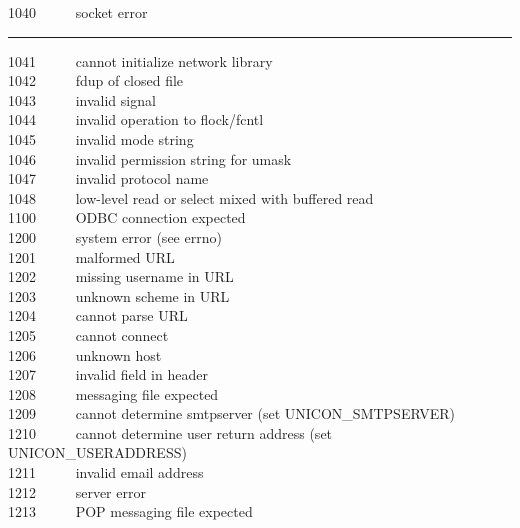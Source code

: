 1040 \ \ \ \ \ socket error\\

\bigskip\hrule\vspace{0.1cm}

1041 \ \ \ \ \ cannot initialize network library\\
1042 \ \ \ \ \ fdup of closed file\\
1043 \ \ \ \ \ invalid signal\\
1044 \ \ \ \ \ invalid operation to flock/fcntl\\
1045 \ \ \ \ \ invalid mode string\\
1046 \ \ \ \ \ invalid permission string for umask\\
1047 \ \ \ \ \ invalid protocol name\\
1048 \ \ \ \ \ low-level read or select mixed with buffered read\\
1100 \ \ \ \ \ ODBC connection expected\\
1200 \ \ \ \ \ system error (see errno)\\
1201 \ \ \ \ \ malformed URL\\
1202 \ \ \ \ \ missing username in URL\\
1203 \ \ \ \ \ unknown scheme in URL\\
1204 \ \ \ \ \ cannot parse URL\\
1205 \ \ \ \ \ cannot connect\\
1206 \ \ \ \ \ unknown host\\
1207 \ \ \ \ \ invalid field in header\\
1208 \ \ \ \ \ messaging file expected\\
1209 \ \ \ \ \ cannot determine smtpserver
(set UNICON\_SMTPSERVER)\\
1210 \ \ \ \ \ cannot determine user return address
(set UNICON\_USERADDRESS)\\
1211 \ \ \ \ \ invalid email address\\
1212 \ \ \ \ \ server error\\
1213 \ \ \ \ \ POP messaging file expected\\
